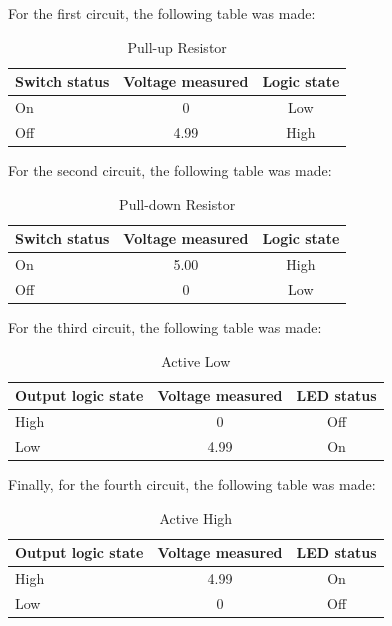 \documentclass[12pt]{article}  %
\begin{document}
For the first circuit, the following table was made:
\begin{table}[H]
  \centering
  \begin{tabular}{|l|c|c|}
    \hline
    \textbf{Switch status} & \textbf{Voltage measured} & \textbf{Logic state} \\
    \hline
    On & 0 & Low \\
    Off & 4.99 & High \\
    \hline
  \end{tabular}
  \caption{Pull-up Resistor}
  \label{tab:pullup}
\end{table}

For the second circuit, the following table was made:
\begin{table}[H]
  \centering
  \begin{tabular}{|l|c|c|}
    \hline
    \textbf{Switch status} & \textbf{Voltage measured} & \textbf{Logic state} \\
    \hline
    On & 5.00 & High \\
    Off & 0 & Low \\
    \hline
  \end{tabular}
  \caption{Pull-down Resistor}
  \label{tab:pulldown}
\end{table}

For the third circuit, the following table was made:
\begin{table}[H]
  \centering
  \begin{tabular}{|l|c|c|}
    \hline
    \textbf{Output logic state} & \textbf{Voltage measured} & \textbf{LED status} \\
    \hline
    High & 0 & Off \\
    Low & 4.99 & On \\
    \hline
  \end{tabular}
  \caption{Active Low}
  \label{tab:activelow}
\end{table}

Finally, for the fourth circuit, the following table was made:
\begin{table}[H]
  \centering
  \begin{tabular}{|l|c|c|}
    \hline
    \textbf{Output logic state} & \textbf{Voltage measured} & \textbf{LED status} \\
    \hline
    High & 4.99 & On \\
    Low & 0 & Off \\
    \hline
  \end{tabular}
  \caption{Active High}
  \label{tab:activehigh}
\end{table}
\end{document}
